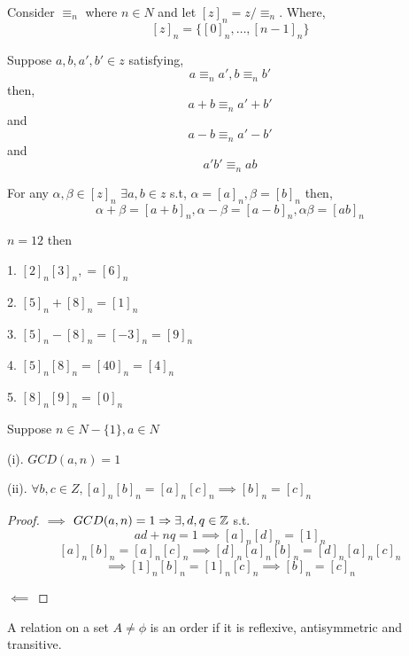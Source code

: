 Consider $\equiv_n$ where $n \in N$ and let $[z]_n = z / \equiv_n$. Where, $$[z]_n = \{[0]_n, \dots,[n-1]_n\}$$

\begin{lemma}
    Suppose $a,b,a',b' \in z$ satisfying, 
    $$ a\equiv_n a', b\equiv_n b' $$  then, 
    $$ a+b \equiv_n a' + b' $$  and 
    $$ a-b \equiv_n a' - b' $$ and  
    $$ a'b' \equiv_n ab $$ 
\end{lemma}
 

\begin{definition}
    For any $\alpha, \beta \in [z]_n$ $\exists a,b \in z$ s.t, $\alpha = [a]_n, \beta = [b]_n$ then, 
    $$ \alpha + \beta = [a+b]_n, \alpha - \beta = [a - b]_n, \alpha \beta = [ab]_n$$ 
\end{definition}

\begin{eg}
    $n = 12$ then 

    1. $[2]_n [3]_n, = [6]_n$

    2. $[5]_n + [8]_n = [1]_n$

    3. $[5]_n - [8]_n = [-3]_n = [9]_n$ 

    4. $[5]_n [8]_n = [40]_n = [4]_n$

    5. $[8]_n [9]_n = [0]_n$
\end{eg}    


\begin{theorem}
    Suppose $n \in N - \{1\}, a \in N$ 

    (i). $GCD(a,n) = 1$ 

    (ii). $\forall b,c \in Z, [a]_n[b]_n = [a]_n[c]_n \implies [b]_n = [c]_n$
\end{theorem}

\begin{proof}
    $\implies$ $GCD(a,n) = 1 \Rightarrow \exists, d,q \in \mathbb{Z}$ s.t. 
    $$ ad + nq = 1 \implies [a]_n [d]_n = [1]_n $$ 
    $$ [a]_n[b]_n = [a]_n[c]_n \implies [d]_n[a]_n[b]_n = [d]_n[a]_n[c]_n $$ 
    $$ \implies [1]_n[b]_n = [1]_n[c]_n \implies [b]_n = [c]_n $$ 

    $\impliedby$






\end{proof}


\begin{definition}
    A relation on a set $A \ne \phi$ is an order if it is reflexive, antisymmetric and transitive.
\end{definition}

